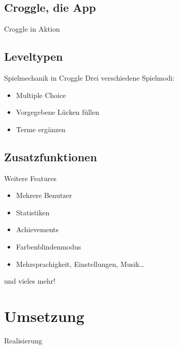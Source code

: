 \documentclass[18pt]{beamer}
\begin{document}
	\subsection{Croggle, die App}
	\begin{frame}{Croggle in Aktion}
	\end{frame}
	
	\subsection{Leveltypen}
	\begin{frame}[<+->]{Spielmechanik in Croggle}
		Drei verschiedene Spielmodi:
		\begin{itemize}
			\item Multiple Choice
			\item Vorgegebene Lücken füllen
			\item Terme ergänzen
		\end{itemize}
	\end{frame}

	\subsection{Zusatzfunktionen}
	\begin{frame}[<+->]{Weitere Features}
		\begin{itemize}
			\item Mehrere Benutzer
			\item Statistiken
			\item Achievements
			\item Farbenblindenmodus
			\item Mehrsprachigkeit, Einstellungen, Musik\dots
		\end{itemize}
		und vieles mehr!
	\end{frame}

\section{Umsetzung}
	\begin{frame}{Realisierung}
	\end{frame}
\end{document}
